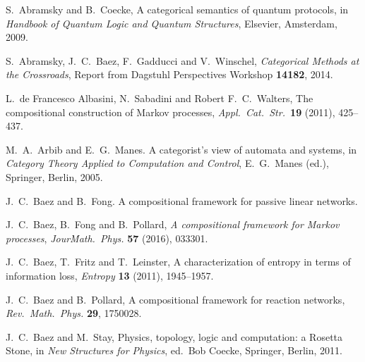 \documentclass[12pt]{amsart}
\begin{document}
\begin{thebibliography}{10}

 S.\ Abramsky and B.\ Coecke, A categorical semantics of quantum protocols, in \textsl{Handbook of Quantum Logic and Quantum Structures}, Elsevier, Amsterdam, 2009.  %

 S.\ Abramsky, J.\ C.\ Baez, F.\ Gadducci and V.\ Winschel, \textsl{Categorical Methods at the Crossroads}, Report from Dagstuhl Perspectives Workshop \textbf{14182}, 2014.  %

 L.\ de Francesco Albasini, N.\ Sabadini and Robert F.\ C.\ Walters, The compositional construction of Markov processes, \textsl{Appl.\ Cat.\ Str.\ }{\bf 19} (2011), 425--437.

 M.\ A.\ Arbib and E.\ G.\ Manes. A categorist’s view of automata and systems, in \textsl{Category Theory Applied to Computation and Control}, E.\ G.\ Manes (ed.), Springer, Berlin, 2005.

  J.\ C.\ Baez and B.\ Fong. A compositional framework for passive linear networks.  %

  J.\ C.\ Baez, B.\ Fong and B.\ Pollard, \textsl{A compositional framework for Markov processes}, \textsl{Jour\. Math.\ Phys.} \textbf{57} (2016), 033301. %

  J.\ C.\ Baez, T.\ Fritz and T.\ Leinster, A characterization of entropy in terms of information loss, \textsl{Entropy} \textbf{13} (2011), 1945--1957.  %

 J.\ C.\ Baez and B.\ Pollard, A compositional framework for reaction networks, 
\textsl{Rev.\ Math.\ Phys.} \textbf{29}, 1750028.  %

  J.\ C.\ Baez and M.\ Stay, Physics, topology, logic and computation: a Rosetta Stone, in \textsl{New Structures for Physics}, ed.\ Bob Coecke, Springer, Berlin, 2011.  %


\end{thebibliography}
\end{document}
